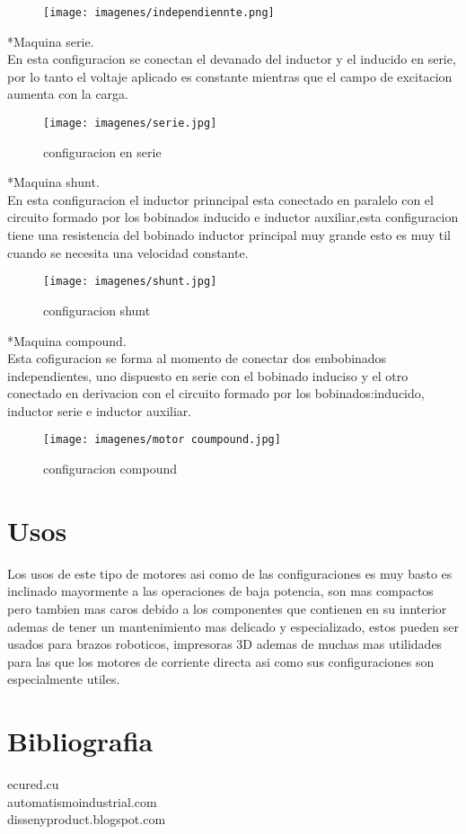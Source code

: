 \documentclass[12pt]{article}
\begin{document}
\begin{figure}[htp]
\centering
\texttt{[image: imagenes/independiennte.png]}
\caption{}
\label{excitacion independiente.}
\end{figure}

*Maquina serie.\\
En esta configuracion se conectan el devanado del inductor y el inducido en serie, por lo tanto el voltaje aplicado es constante mientras que el campo de excitacion aumenta con la carga.\\

\begin{figure}[htp]
\centering
\texttt{[image: imagenes/serie.jpg]}
\caption{configuracion en serie}
\label{configuracion en serie}
\end{figure}


*Maquina shunt.\\
En esta configuracion el inductor prinncipal esta conectado en paralelo con el circuito formado por los bobinados inducido e inductor auxiliar,esta configuracion tiene una resistencia del bobinado inductor principal muy grande esto es muy til cuando se necesita una velocidad constante.

\begin{figure}[htp]
\centering
\texttt{[image: imagenes/shunt.jpg]}
\caption{configuracion shunt}
\label{configuracion shunt}
\end{figure}

*Maquina compound.\\
Esta cofiguracion se forma al momento de conectar dos embobinados independientes, uno dispuesto en serie con el bobinado induciso y el otro conectado en derivacion con el circuito formado por los bobinados:inducido, inductor serie e 
inductor auxiliar. 

\begin{figure}[htp]
\centering
\texttt{[image: imagenes/motor coumpound.jpg]}
\caption{configuracion compound}
\label{.}
\end{figure}

\section{Usos}
Los usos de este tipo de motores asi como de las configuraciones es muy basto es inclinado mayormente a las operaciones de baja potencia, son mas compactos pero tambien mas caros debido a los componentes que contienen en su innterior ademas de tener un mantenimiento mas delicado y especializado, estos pueden ser usados para brazos roboticos, impresoras 3D ademas de muchas mas utilidades para las que los motores  de corriente directa asi como sus configuraciones son especialmente utiles.

\maketitle
\section{Bibliografia}

ecured.cu\\
automatismoindustrial.com\\
dissenyproduct.blogspot.com\\ 
\end{document}

